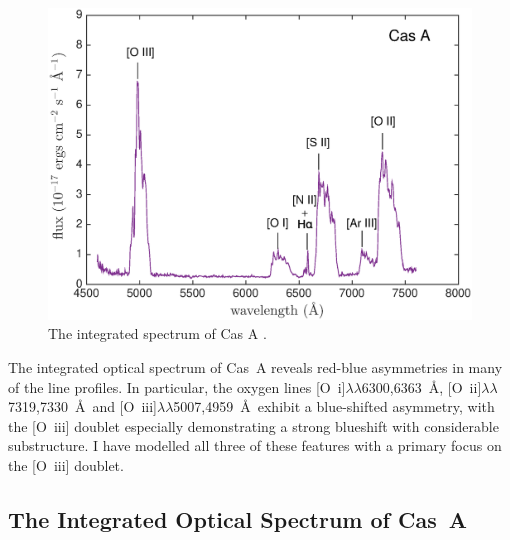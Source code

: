 \begin{figure}
\centering
\includegraphics[clip=true,scale=0.6, trim=30 0 50 20]{chapters/chapter6/figs/CasA/spectrum}
\caption{The integrated spectrum of Cas A \citep{Milisavljevic2013}.}
\label{CasA_spectrum}
\end{figure}

The integrated optical spectrum of Cas~A \citep{Milisavljevic2013} reveals red-blue asymmetries in many of the  line profiles.  In particular, the oxygen lines [O~{\sc i}]$\lambda\lambda$6300,6363~\AA, [O~{\sc ii}]$\lambda\lambda$7319,7330~\AA\  and [O~{\sc iii}]$\lambda\lambda$5007,4959~\AA\ exhibit a blue-shifted asymmetry, with the [O~{\sc iii}] doublet especially demonstrating a strong blueshift with considerable substructure.  I have modelled all three of these features with a primary focus on the [O~{\sc iii}] doublet.

\subsection{The Integrated Optical Spectrum of Cas~A}

